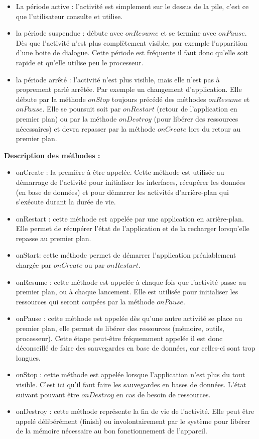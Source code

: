 \documentclass[francais,12pt]{article}
\begin{document}
		\begin{itemize}
			\item La période active : l'activité est simplement sur le dessus de la pile, c'est ce que l'utilisateur consulte et utilise. 
			\item la période suspendue : débute avec $onResume$ et se termine avec $onPause$. Dès que l'activité n'est plus complètement visible, par exemple l'apparition d'une boite de dialogue. Cette période est fréquente il faut donc qu'elle soit rapide et qu'elle utilise peu le processeur.
			\item la période arrêté : l'activité n'est plus visible, mais elle n'est pas à proprement parlé arrêtée. Par exemple un changement d'application. Elle débute par la méthode $onStop$ toujours précédé des méthodes $onResume$ et $onPause$. Elle se poursuit soit par $onRestart$ (retour de l'application en premier plan) ou par la méthode $onDestroy$ (pour libérer des ressources nécessaires) et devra repasser par la méthode $onCreate$ lors du retour au premier plan.
		\end{itemize}
		
			\textbf{Description des méthodes :}
		\begin{itemize}
			\item onCreate : la première à être appelée. Cette méthode est utilisée au démarrage de l'activité pour initialiser les interfaces, récupérer les données (en base de données) et pour démarrer les activités d'arrière-plan qui s'exécute durant la durée de vie.
			\item onRestart : cette méthode est appelée par une application en arrière-plan. Elle permet de récupérer l'état de l'application et de la recharger lorsqu'elle repasse au premier plan.
			\item onStart: cette méthode permet de démarrer l'application préalablement chargée par $onCreate$ ou par $onRestart$.
			\item onResume : cette méthode est appelée à chaque fois que l'activité passe au premier plan, ou à chaque lancement. Elle est utilisée pour initialiser les ressources qui seront coupées par la méthode $onPause$. 
			\item onPause : cette méthode est appelée dès qu'une autre activité se place au premier plan, elle permet de libérer des ressources (mémoire, outils, processeur). Cette étape peut-être fréquemment appelée il est donc déconseillé de faire des sauvegardes en base de données, car celles-ci sont trop longues.
			\item onStop : cette méthode est appelée lorsque l'application n'est plus du tout visible. C'est ici qu'il faut faire les sauvegardes en bases de données. L'état suivant pouvant être $onDestroy$ en cas de besoin de ressources. 
			\item onDestroy : cette méthode représente la fin de vie de l'activité. Elle peut être appelé délibérément (finish) ou involontairement par le système pour libérer de la mémoire nécessaire au bon fonctionnement de l'appareil.\newline
		\end{itemize}
	
\end{document}
